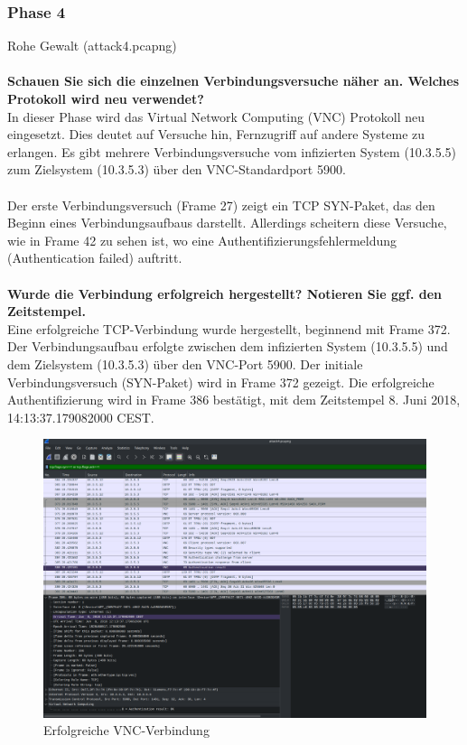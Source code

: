 \documentclass[
    a4paper,
    pagesize,
	pdftex,
    12pt,
]{scrartcl}
\begin{document}
\subsubsection{Phase 4}
Rohe Gewalt (attack4.pcapng)
\\ \\
\textbf{Schauen Sie sich die einzelnen Verbindungsversuche näher an. Welches Protokoll wird neu verwendet?}
\\
In dieser Phase wird das Virtual Network Computing (VNC) Protokoll neu eingesetzt. Dies deutet auf Versuche hin, Fernzugriff auf andere Systeme zu erlangen. Es gibt mehrere Verbindungsversuche vom infizierten System (10.3.5.5) zum Zielsystem (10.3.5.3) über den VNC-Standardport 5900.
\\ \\
Der erste Verbindungsversuch (Frame 27) zeigt ein TCP SYN-Paket, das den Beginn eines Verbindungsaufbaus darstellt. Allerdings scheitern diese Versuche, wie in Frame 42 zu sehen ist, wo eine Authentifizierungsfehlermeldung (Authentication failed) auftritt.
\\ \\
\textbf{Wurde die Verbindung erfolgreich hergestellt? Notieren Sie ggf. den Zeitstempel.}
\\
Eine erfolgreiche TCP-Verbindung wurde hergestellt, beginnend mit Frame 372. Der Verbindungsaufbau erfolgte zwischen dem infizierten System (10.3.5.5) und dem Zielsystem (10.3.5.3) über den VNC-Port 5900. Der initiale Verbindungsversuch (SYN-Paket) wird in Frame 372 gezeigt. Die erfolgreiche Authentifizierung wird in Frame 386 bestätigt, mit dem Zeitstempel 8. Juni 2018, 14:13:37.179082000 CEST.

\begin{figure}[H]
    \centering
    \includegraphics[width=\textwidth]{ws-vnc-connection.png}
    \caption{Erfolgreiche VNC-Verbindung}
    \label{fig:ws-vnc-connection}
\end{figure}
\end{document}
